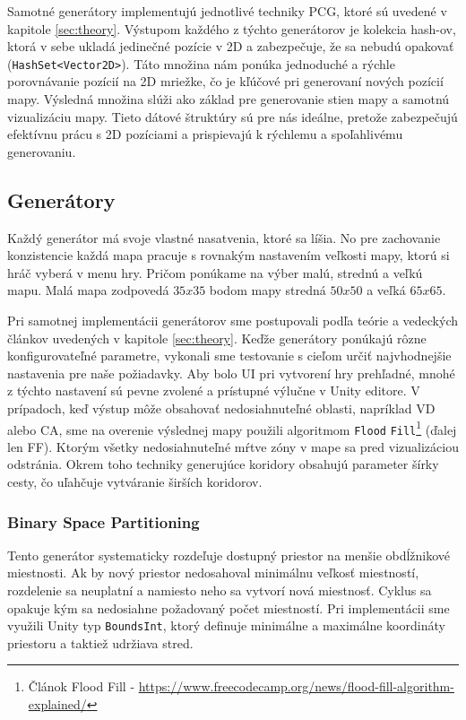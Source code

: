 Samotné generátory implementujú jednotlivé techniky PCG, ktoré sú uvedené v kapitole \ref{sec:theory}. Výstupom každého z týchto generátorov je kolekcia hash-ov, ktorá v sebe ukladá jedinečné pozície v 2D a zabezpečuje, že sa nebudú opakovať (\verb|HashSet<Vector2D>|). Táto množina nám ponúka jednoduché a rýchle porovnávanie pozícií na 2D mriežke, čo je kľúčové pri generovaní nových pozícií mapy. Výsledná množina slúži ako základ pre generovanie stien mapy a samotnú vizualizáciu mapy. Tieto dátové štruktúry sú pre nás ideálne, pretože zabezpečujú efektívnu prácu s 2D pozíciami a prispievajú k rýchlemu a spoľahlivému generovaniu.

\subsection{Generátory}

Každý generátor má svoje vlastné nasatvenia, ktoré sa líšia. No pre zachovanie konzistencie každá mapa pracuje s rovnakým nastavením veľkosti mapy, ktorú si hráč vyberá v menu hry. Pričom ponúkame na výber malú, strednú a veľkú mapu. Malá mapa zodpovedá $35x35$ bodom mapy stredná $50x50$ a veľká $65x65$.

Pri samotnej implementácii generátorov sme postupovali podľa teórie a vedeckých článkov uvedených v kapitole \ref{sec:theory}. Keďže generátory ponúkajú rôzne konfigurovateľné parametre, vykonali sme testovanie s cieľom určiť najvhodnejšie nastavenia pre naše požiadavky. Aby bolo UI pri vytvorení 
hry prehľadné, mnohé z týchto nastavení sú pevne zvolené a prístupné výlučne v Unity editore. V prípadoch, keď výstup môže obsahovať nedosiahnuteľné oblasti, napríklad VD alebo CA, sme na overenie výslednej mapy použili algoritmom \verb|Flood| \verb|Fill|\footnote{Článok Flood Fill - \url{https://www.freecodecamp.org/news/flood-fill-algorithm-explained/}} (ďalej len FF). Ktorým všetky nedosiahnuteľné mŕtve zóny v mape sa pred vizualizáciou odstránia. Okrem toho techniky generujúce koridory obsahujú parameter šírky cesty, čo uľahčuje vytváranie širších koridorov.

\subsubsection*{Binary Space Partitioning}

Tento generátor systematicky rozdeľuje dostupný priestor na menšie obdĺžnikové miestnosti. Ak by nový priestor nedosahoval minimálnu veľkosť miestností, rozdelenie sa neuplatní a namiesto neho sa vytvorí nová miestnosť. Cyklus sa opakuje kým sa nedosiahne požadovaný počet miestností. Pri implementácii sme využili Unity typ \verb|BoundsInt|, ktorý definuje minimálne a maximálne koordináty priestoru a taktiež udržiava stred.


